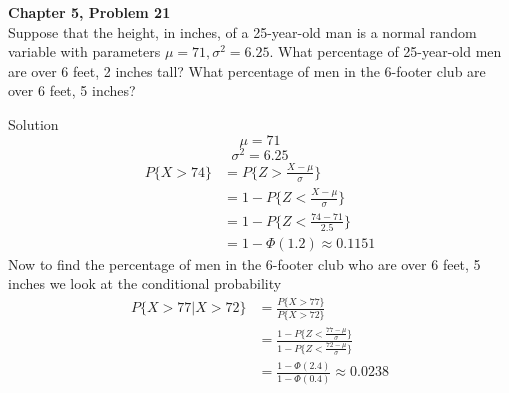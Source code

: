 \documentclass{article}
\begin{document}
\begin{spacing}{1.1}
\newpage
\begin{homeworkProblem}
  {\bf Chapter 5, Problem 21}\\
  Suppose that the height, in inches, of a 25-year-old man is a normal random 
  variable with parameters $\mu = 71, \sigma^2 = 6.25$.  
  What percentage of 25-year-old men are over 6 feet, 2 inches tall? 
  What percentage of men in the 6-footer club are over 6 feet, 5 inches?
  \begin{homeworkSection}{Solution}
    \[\mu = 71\]
    \[\sigma^2 = 6.25\]
    \begin{align*}
      P\{ X > 74 \} &= P\{ Z > \frac{ X - \mu}{ \sigma}\}\\
                    &= 1 - P\{ Z < \frac{ X - \mu}{ \sigma}\}\\
                    &= 1 - P\{ Z < \frac{ 74 - 71}{ 2.5}\}\\
                    &= 1 - \Phi( 1.2) \approx 0.1151
    \end{align*}
    Now to find the percentage of men in the 6-footer club who are over 6 feet, 5 inches
    we look at the conditional probability
    \begin{align*}
      P\{ X > 77 | X > 72\} &= \frac{ P\{ X > 77\}}{ P\{ X > 72\}}\\
                            &= \frac{ 1 - P\{ Z < \frac{ 77 - \mu}{ \sigma}\}}{ 1 - P\{ Z < \frac{ 72 - \mu}{ \sigma}\}}\\
                            &= \frac{ 1 - \Phi( 2.4)}{ 1 - \Phi( 0.4)} \approx 0.0238
    \end{align*}
  \end{homeworkSection}
\end{homeworkProblem}


\end{spacing}
\end{document}
